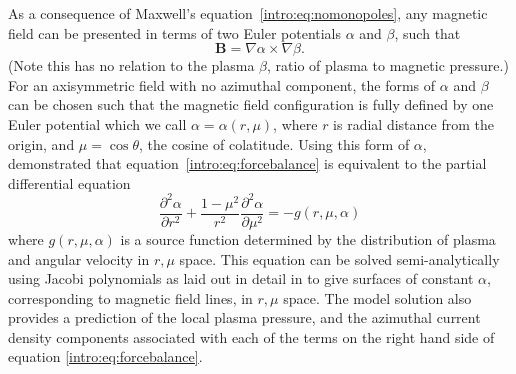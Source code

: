 As a consequence of Maxwell's equation~\ref{intro:eq:nomonopoles}, any magnetic field can be presented in terms of two Euler potentials $\alpha$ and $\beta$, such that 
\begin{equation}
\boldsymbol{B} = \nabla \alpha \times \nabla \beta.
\end{equation}
(Note this has no relation to the plasma $\beta$, ratio of plasma to magnetic pressure.) For an axisymmetric field with no azimuthal component, the forms of $\alpha$ and $\beta$ can be chosen such that the magnetic field configuration is fully defined by one Euler potential which we call $\alpha = \alpha(r,\mu)$, where $r$ is radial distance from the origin, and $\mu = \cos\theta$, the cosine of colatitude. Using this form of $\alpha$, \citet{caudal1986} demonstrated that equation~\ref{intro:eq:forcebalance} is equivalent to the partial differential equation
\begin{equation}\label{intro:eq:pde}
\frac{\partial^2\alpha}{\partial r^2} + \frac{1-\mu^2}{r^2} \frac{\partial^2\alpha}{\partial \mu^2} = -g(r,\mu,\alpha)
\end{equation}
where $g(r,\mu,\alpha)$ is a source function determined by the distribution of plasma and angular velocity in $r,\mu$ space. This equation can be solved semi-analytically using Jacobi polynomials as laid out in detail in \citet[Appendix]{achilleos2010a} to give surfaces of constant $\alpha$, corresponding to magnetic field lines, in $r, \mu$ space. The model solution also provides a prediction of the local plasma pressure, and the azimuthal current density components associated with each of the terms on the right hand side of equation \ref{intro:eq:forcebalance}. 

